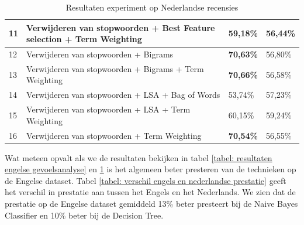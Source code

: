 \begin{table}[h]
\begin{adjustbox}{width=1\textwidth}
\begin{tabular}{|l|l|l|l|}
11       & Verwijderen van stopwoorden + Best Feature selection + Term Weighting         & 59,18\%                                 & 56,44\%                        \\ \hline
12       & Verwijderen van stopwoorden + Bigrams                                     & {\bf 70,63\%}                           & 56,80\%                        \\ \hline
13       & Verwijderen van stopwoorden + Bigrams + Term Weighting                    & {\bf 70,66\%}                           & 56,58\%                        \\ \hline
14       & Verwijderen van stopwoorden + LSA + Bag of Words                     & 53,74\%                                 & 57,23\%                        \\ \hline
15       & Verwijderen van stopwoorden + LSA + Term Weighting                            & 60,15\%                                 & 59,24\%                        \\ \hline
16       & Verwijderen van stopwoorden + Term Weighting                                         & {\bf 70,54\%}                           & 56,55\%                        \\ \hline
\end{tabular}
\end{adjustbox}

\caption{Resultaten experiment op Nederlandse recensies}
\label{tabel: resultaten Nederlandse gevoelsanalyse}
\end{table}


Wat meteen opvalt als we de resultaten bekijken in tabel \ref{tabel: resultaten engelse gevoelsanalyse} en \ref{tabel: resultaten Nederlandse gevoelsanalyse} is het algemeen beter presteren van de technieken op de Engelse dataset. Tabel \ref{tabel: verschil engels en nederlandse prestatie} geeft het verschil in prestatie aan tussen het Engels en het Nederlands. We zien dat de prestatie op de Engelse dataset gemiddeld 13\% beter presteert bij de Naive Bayes Classifier en 10\% beter bij de Decision Tree.


